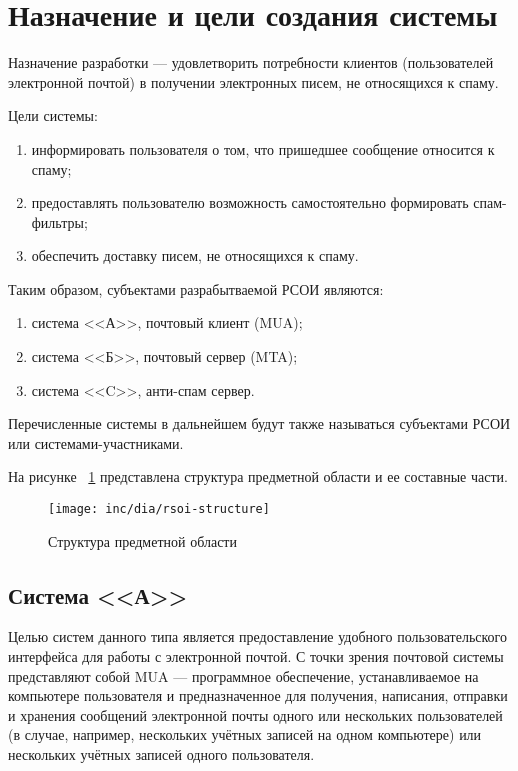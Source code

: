 \section{Назначение и цели создания системы}
Назначение разработки --- удовлетворить потребности клиентов (пользователей электронной почтой) в получении электронных писем, не относящихся к спаму.

Цели системы:
\begin{enumerate}
	\item информировать пользователя о том, что пришедшее сообщение относится к спаму;
	\item предоставлять пользователю возможность самостоятельно формировать спам-фильтры;
	\item обеспечить доставку писем, не относящихся к спаму.
\end{enumerate}

Таким образом, субъектами разрабытваемой РСОИ являются:

\begin{enumerate}
\item{система <<А>>}, почтовый клиент (MUA);
\item{система <<Б>>}, почтовый сервер (MTA);
\item{система <<C>>}, анти-спам сервер. 
\end{enumerate}

Перечисленные системы в дальнейшем будут также называться субъектами РСОИ или системами-участниками.

На рисунке ~\ref{fig:fig01} представлена структура предметной области и ее составные части.

\begin{figure}
  \centering
  \texttt{[image: inc/dia/rsoi-structure]}
  \caption{Структура предметной области}
  \label{fig:fig01}
\end{figure}


\subsection{Система <<А>>}
Целью систем данного типа является предоставление удобного пользовательского интерфейса для работы с электронной почтой. С точки зрения почтовой системы представляют собой MUA --- программное обеспечение, устанавливаемое на компьютере пользователя и предназначенное для получения, написания, отправки и хранения сообщений электронной почты одного или нескольких пользователей (в случае, например, нескольких учётных записей на одном компьютере) или нескольких учётных записей одного пользователя. 


